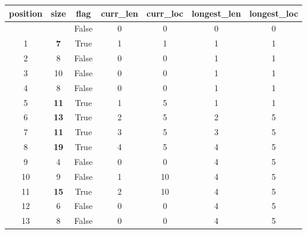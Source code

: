 \begin{inlinetable}
  \begin{tabular}{S[table-format=2.0] S[table-format=2.0] c S[table-format=2.0]
    S[table-format=2.0] S[table-format=2.0] S[table-format=2.0]}
    \toprule
    {position} & {size}       & {f{}lag} & {curr\_len} & {curr\_loc} & {longest\_len} & {longest\_loc} \\
    \midrule                             
               &              & False    & 0           & 0           & 0              & 0              \\
    1          & \bfseries 7  & True     & 1           & 1           & 1              & 1              \\
    2          & 8            & False    & 0           & 0           & 1              & 1              \\
    3          & 10           & False    & 0           & 0           & 1              & 1              \\
    4          & 8            & False    & 0           & 0           & 1              & 1              \\
    5          & \bfseries 11 & True     & 1           & 5           & 1              & 1              \\
    6          & \bfseries 13 & True     & 2           & 5           & 2              & 5              \\
    7          & \bfseries 11 & True     & 3           & 5           & 3              & 5              \\
    8          & \bfseries 19 & True     & 4           & 5           & 4              & 5              \\
    9          & 4            & False    & 0           & 0           & 4              & 5              \\
    10         & 9            & False    & 1           & 10          & 4              & 5              \\
    11         & \bfseries 15 & True     & 2           & 10          & 4              & 5              \\
    12         & 6            & False    & 0           & 0           & 4              & 5              \\
    13         & 8            & False    & 0           & 0           & 4              & 5              \\
    \bottomrule
  \end{tabular}
\end{inlinetable}

